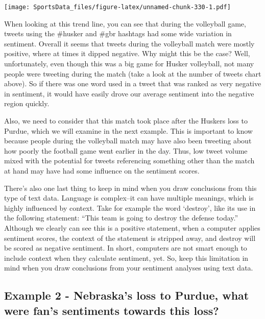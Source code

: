 \documentclass[
]{book}
\begin{document}
\texttt{[image: SportsData\_files/figure-latex/unnamed-chunk-330-1.pdf]}

When looking at this trend line, you can see that during the volleyball game, tweets using the \#husker and \#gbr hashtags had some wide variation in sentiment. Overall it seems that tweets during the volleyball match were mostly positive, where at times it dipped negative. Why might this be the case? Well, unfortunately, even though this was a big game for Husker volleyball, not many people were tweeting during the match (take a look at the number of tweets chart above). So if there was one word used in a tweet that was ranked as very negative in sentiment, it would have easily drove our average sentiment into the negative region quickly.

Also, we need to consider that this match took place after the Huskers loss to Purdue, which we will examine in the next example. This is important to know because people during the volleyball match may have also been tweeting about how poorly the football game went earlier in the day. Thus, low tweet volume mixed with the potential for tweets referencing something other than the match at hand may have had some influence on the sentiment scores.

There's also one last thing to keep in mind when you draw conclusions from this type of text data. Language is complex--it can have multiple meanings, which is highly influenced by context. Take for example the word `destroy', like its use in the following statement: ``This team is going to destroy the defense today.'' Although we clearly can see this is a positive statement, when a computer applies sentiment scores, the context of the statement is stripped away, and destroy will be scored as negative sentiment. In short, computers are not smart enough to include context when they calculate sentiment, yet. So, keep this limitation in mind when you draw conclusions from your sentiment analyses using text data.

\hypertarget{example-2---nebraskas-loss-to-purdue-what-were-fans-sentiments-towards-this-loss}{%
\subsection{Example 2 - Nebraska's loss to Purdue, what were fan's sentiments towards this loss?}\label{example-2---nebraskas-loss-to-purdue-what-were-fans-sentiments-towards-this-loss}}
\end{document}
